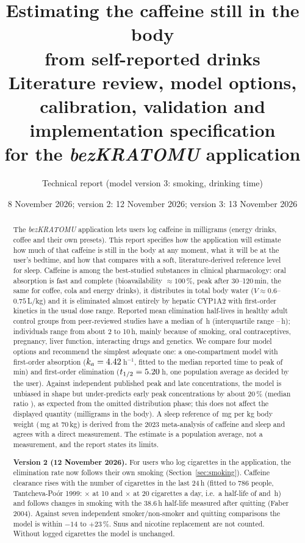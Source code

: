\documentclass[10pt,a4paper]{article}
\title{\textbf{Estimating the caffeine still in the body\\from self-reported drinks}\\[4pt]
\large Literature review, model options, calibration, validation and implementation specification\\for the \emph{bezKRATOMU} application}
\author{Technical report (model version 3: smoking, drinking time)}
\date{8 November 2026; version 2: 12 November 2026; version 3: 13 November 2026}
\newcommand{\ka}{k_a}
\begin{document}
\maketitle

\begin{abstract}
\noindent
The \emph{bezKRATOMU} application lets users log caffeine in milligrams (energy drinks, coffee and their
own presets). This report specifies how the application will estimate how much of that caffeine is still in
the body at any moment, what it will be at the user's bedtime, and how that compares with a soft,
literature-derived reference level for sleep. Caffeine is among the best-studied substances in clinical
pharmacology: oral absorption is fast and complete (bioavailability $\approx 100\,\%$, peak after
30--120\,min, the same for coffee, cola and energy drinks), it distributes in total body water
($V\approx 0.6$--$0.75$\,L/kg) and it is eliminated almost entirely by hepatic CYP1A2 with first-order
kinetics in the usual dose range. Reported mean elimination half-lives in \nNStudiesHL{} healthy adult control
groups from peer-reviewed studies have a median of \nTHalf\,h (interquartile range \nTHalfQone--\nTHalfQthree\,h);
individuals range from about 2 to 10\,h, mainly because of smoking, oral contraceptives, pregnancy, liver
function, interacting drugs and genetics. We compare four model options and recommend the simplest
adequate one: a one-compartment model with first-order absorption ($\ka=\nKa$\,h$^{-1}$, fitted to the
median reported time to peak of \nTmaxMed\,min) and first-order elimination ($t_{1/2}=5.20$\,h, one
population average as decided by the user). Against independent published peak and late concentrations,
the model is unbiased in shape but under-predicts early peak concentrations by about 20\,\% (median ratio
\nRatioMed), as expected from the omitted distribution phase; this does not affect the displayed quantity
(milligrams in the body). A sleep reference of \nRefMgKg\,mg per kg body weight (\nRefMg\,mg at 70\,kg) is derived
from the 2023 meta-analysis of caffeine and sleep and agrees with a direct measurement. The estimate is a
population average, not a measurement, and the report states its limits.

\smallskip\noindent\textbf{Version 2 (12 November 2026).} For users who log cigarettes in the application, the
elimination rate now follows their own smoking (Section~\ref{sec:smoking}). Caffeine clearance rises with the number
of cigarettes in the last 24\,h (fitted to 786 people, Tantcheva-Po\'or 1999: $\times$\nSmMten{} at 10 and
$\times$\nSmMtwenty{} at 20 cigarettes a day, i.e.\ a half-life of \nSmThalfTen{} and \nSmThalfTwenty\,h) and follows
changes in smoking with the 38.6\,h half-life measured after quitting (Faber 2004). Against seven independent
smoker/non-smoker and quitting comparisons the model is within $-14$ to $+23\,\%$. Snus and nicotine replacement are
not counted. Without logged cigarettes the model is unchanged.
\end{abstract}
\end{document}

